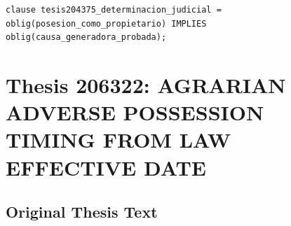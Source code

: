 \documentclass[11pt,a4paper]{article}
\begin{document}
\begin{lstlisting}[style=witnessstyle, language=Witness]
clause tesis204375_determinacion_judicial = oblig(posesion_como_propietario) IMPLIES oblig(causa_generadora_probada);
\end{lstlisting}

\newpage

\section{Thesis 206322: AGRARIAN ADVERSE POSSESSION TIMING FROM LAW EFFECTIVE DATE}
\label{thesis:206322}

\subsection{Original Thesis Text}
\end{document}
